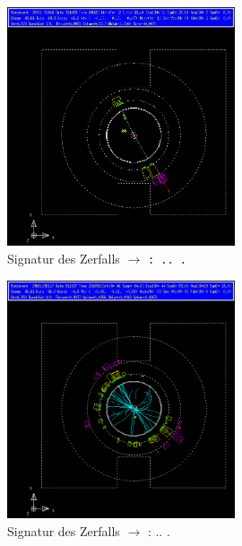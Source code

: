 \begin{figure}[H]
\begin{center}
  \includegraphics[width=0.6\textwidth]{../img/gropepics/tt1b.png}
  \caption{Signatur des Zerfalls \Z $\to$ \tt: .. .}
  \label{img:sig:tt}
\end{center}
\end{figure} 

\begin{figure}[H]
\begin{center}
  \includegraphics[width=0.6\textwidth]{../img/gropepics/qq1b.png}
  \caption{Signatur des Zerfalls \Z $\to$ \qq: .. .}
  \label{img:sig:qq}
\end{center}
\end{figure} 